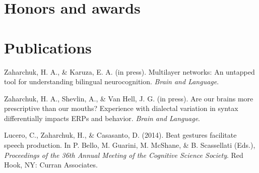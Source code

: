 \documentclass[11pt, a4paper]{awesome-cv}
\begin{document}
\hypertarget{honors-and-awards}{%
\section{Honors and awards}\label{honors-and-awards}}

\begin{cventries}
    \vspace{-4.0mm}
    \vspace{-4.0mm}
    \vspace{-4.0mm}
    \vspace{-4.0mm}
\end{cventries}

\hypertarget{publications}{%
\section{Publications}\label{publications}}

\setlength{\parindent}{-0.2in}
\setlength{\leftskip}{0.2in}

\noindent

\hypertarget{refs_main}{}
\leavevmode\hypertarget{ref-2}{}%
Zaharchuk, H. A., \& Karuza, E. A. (in press). Multilayer networks: An
untapped tool for understanding bilingual neurocognition. \emph{Brain
and Language}.

\leavevmode\hypertarget{ref-3}{}%
Zaharchuk, H. A., Shevlin, A., \& Van Hell, J. G. (in press). Are our
brains more prescriptive than our mouths? Experience with dialectal
variation in syntax differentially impacts {ERPs} and behavior.
\emph{Brain and Language}.

\leavevmode\hypertarget{ref-1}{}%
Lucero, C., Zaharchuk, H., \& Casasanto, D. (2014). Beat gestures
facilitate speech production. In P. Bello, M. Guarini, M. McShane, \& B.
Scassellati (Eds.), \emph{{Proceedings of the 36th Annual Meeting of the
Cognitive Science Society}}. Red Hook, NY: Curran Associates.
\end{document}
